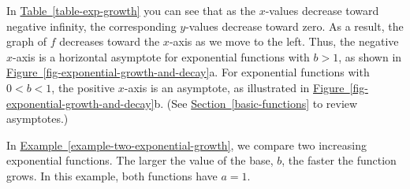 \documentclass[10pt,]{book}
\theoremstyle{plain}
\theoremstyle{definition}
\theoremstyle{definition}
\theoremstyle{definition}
\theoremstyle{definition}
\theoremstyle{definition}
\numberwithin{equation}{section}
\newcommand{\lt}{ < }
\newcommand{\gt}{ > }
\begin{document}
	In \hyperref[table-exp-growth]{Table~\ref{table-exp-growth}} you can see that as the \(x\)-values decrease toward negative infinity, the corresponding \(y\)-values decrease toward zero. As a result, the graph of \(f\) decreases toward the \(x\)-axis as we move to the left. Thus, the negative \(x\)-axis is a horizontal asymptote for exponential functions with \(b \gt 1\), as shown in \hyperref[fig-exponential-growth-and-decay]{Figure~\ref{fig-exponential-growth-and-decay}}a. For exponential functions with \(0 \lt b \lt 1\), the positive \(x\)-axis is an asymptote, as illustrated in \hyperref[fig-exponential-growth-and-decay]{Figure~\ref{fig-exponential-growth-and-decay}}b. (See \hyperref[basic-functions]{Section~\ref{basic-functions}} to review asymptotes.)
%
\par

	In \hyperref[example-two-exponential-growth]{Example~\ref{example-two-exponential-growth}}, we compare two increasing exponential functions. The larger the value of the base, \(b\), the faster the function grows. In this example, both functions have \(a = 1\).
%
\end{document}
